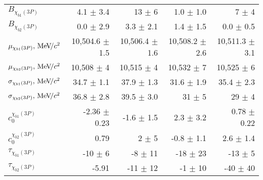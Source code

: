 \begin{table}[H]
{{\begin{tabular}{lrrrr}
\rule{0pt}{4ex}$B_{\chi_{b1}(3P)}$ & 4.1 $\pm$ 3.4 & 13 $\pm$ 6 & 1.0 $\pm$ 1.0 & 7 $\pm$ 4\\
$B_{\chi_{b2}(3P)}$ & 0.0 $\pm$ 2.9 & 3.3 $\pm$ 2.1 & 1.4 $\pm$ 1.5 & 0.0 $\pm$ 0.5\\

\rule{0pt}{4ex}$\mu_{\chi_{b1}(3P)}, {\mathrm{\,Me\kern -0.1em V\!/}c^2}$ & 10,504.6 $\pm$ 1.5 & 10,506.4 $\pm$ 1.6 & 10,508.2 $\pm$ 2.6 & 10,511.3 $\pm$ 3.1\\
$\mu_{\chi_{b2}(3P)}, {\mathrm{\,Me\kern -0.1em V\!/}c^2}$ & 10,508 $\pm$ 4 & 10,515 $\pm$ 4 & 10,532 $\pm$ 7 & 10,525 $\pm$ 6\\

\rule{0pt}{4ex}$\sigma_{\chi_{b1}(3P)}, {\mathrm{\,Me\kern -0.1em V\!/}c^2}$ & 34.7 $\pm$ 1.1 & 37.9 $\pm$ 1.3 & 31.6 $\pm$ 1.9 & 35.4 $\pm$ 2.3\\
$\sigma_{\chi_{b2}(3P)}, {\mathrm{\,Me\kern -0.1em V\!/}c^2}$ & 36.8 $\pm$ 2.8 & 39.5 $\pm$ 3.0 & 31 $\pm$ 5 & 29 $\pm$ 4\\

\rule{0pt}{4ex}$c_0^{\chi_{b1}(3P)}$ & -2.36 $\pm$ 0.23 & -1.6 $\pm$ 1.5 & 2.3 $\pm$ 3.2 & 0.78 $\pm$ 0.22\\
$c_0^{\chi_{b2}(3P)}$ & 0.79 & 2 $\pm$ 5 & -0.8 $\pm$ 1.1 & 2.6 $\pm$ 1.4\\

\rule{0pt}{4ex}$\tau_{\chi_{b1}(3P)}$ & -10 $\pm$ 6 & -8 $\pm$ 11 & -18 $\pm$ 23 & -13 $\pm$ 5\\
$\tau_{\chi_{b2}(3P)}$ & -5.91 & -11 $\pm$ 12 & -1 $\pm$ 10 & -40 $\pm$ 40\\
\bottomrule
\end{tabular}
} %

} %
\label{tab:mc:chib3p_ups1s:fits}
\end{table}

